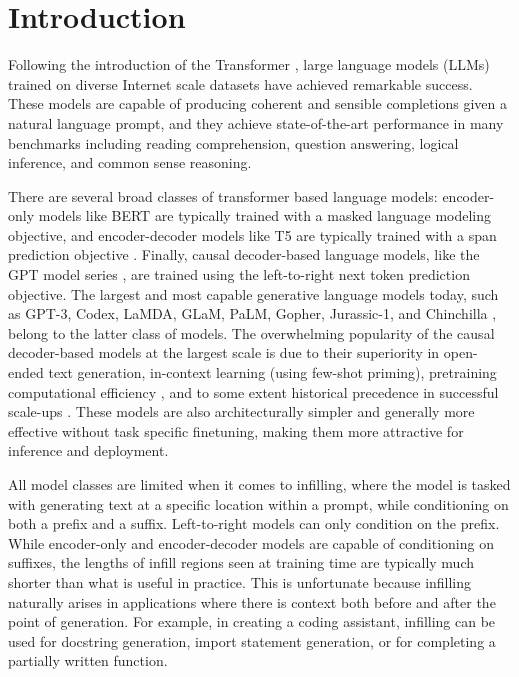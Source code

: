 \documentclass[postscript]{article}
\begin{document}
\section{Introduction}\label{sec:intro}

Following the introduction of the Transformer \citep{transformer}, large language models (LLMs) trained on diverse Internet scale datasets have achieved remarkable success. These models are capable of producing coherent and sensible completions given a natural language prompt, and they achieve state-of-the-art performance in many benchmarks including reading comprehension, question answering, logical inference, and common sense reasoning.

There are several broad classes of transformer based language models: encoder-only models like BERT \citep{bert} are typically trained with a masked language modeling objective, and encoder-decoder models like T5 \citep{T5} are typically trained with a span prediction objective \citep{mass}. Finally, causal decoder-based language models, like the GPT model series \citep{gpt1, gpt2, gpt3}, are trained using the left-to-right next token prediction objective. The largest and most capable generative language models today, such as GPT-3, Codex, LaMDA, GLaM, PaLM, Gopher, Jurassic-1, and Chinchilla \citep{gpt3, codex, lamda, glam, palm, gopher, jur, chinchi}, belong to the latter class of models. The overwhelming popularity of the causal decoder-based models at the largest scale is due to their superiority in open-ended text generation, in-context learning (using few-shot priming), pretraining computational efficiency \citep{huggingface}, and to some extent historical precedence in successful scale-ups \citep{gpt3}. These models are also architecturally simpler and generally more effective without task specific finetuning, making them more attractive for inference and deployment.

All model classes are limited when it comes to infilling, where the model is tasked with generating text at a specific location within a prompt, while conditioning on both a prefix and a suffix. Left-to-right models can only condition on the prefix. While encoder-only and encoder-decoder models are capable of conditioning on suffixes, the lengths of infill regions seen at training time are typically much shorter than what is useful in practice. This is unfortunate because infilling naturally arises in applications where there is context both before and after the point of generation. For example, in creating a coding assistant, infilling can be used for docstring generation, import statement generation, or for completing a partially written function. 
\end{document}
